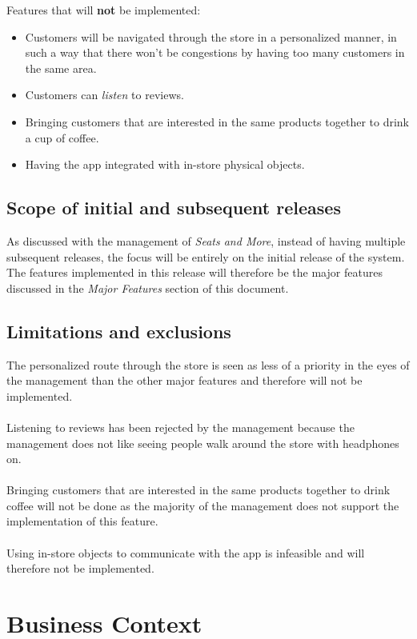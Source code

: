 \documentclass[a4paper]{article}
\begin{document}
Features that will \textbf{not} be implemented:
\begin{itemize}
\item \color{blue} Customers will be navigated through the store in a personalized manner, in such a way that there won't be congestions by having too many customers in the same area.

\item Customers can \textit{listen} to reviews.\color{black}

\item Bringing customers that are interested in the same products together to drink a cup of coffee.
\item Having the app integrated with in-store physical objects.
\end{itemize}

\subsection*{Scope of initial and subsequent releases}
\color{blue}As discussed with the management of \textit{Seats and More}, instead of having multiple subsequent releases, the focus will be entirely on the initial release of the system. The features implemented in this release will therefore be the major features discussed in the \textit{Major Features} section of this document.\color{black}
\subsection*{Limitations and exclusions}
\color{blue}The personalized route through the store is seen as less of a priority in the eyes of the management than the other major features and therefore will not be implemented.\\
\\
Listening to reviews has been rejected by the management because the management does not like seeing people walk around the store with headphones on.\\
\\
Bringing customers that are interested in the same products together to drink coffee will not be done as the majority of the management does not support the implementation of this feature.\\\color{black}
\\
Using in-store objects to communicate with the app is infeasible and will therefore not be implemented.

\section{Business Context}
\end{document}
